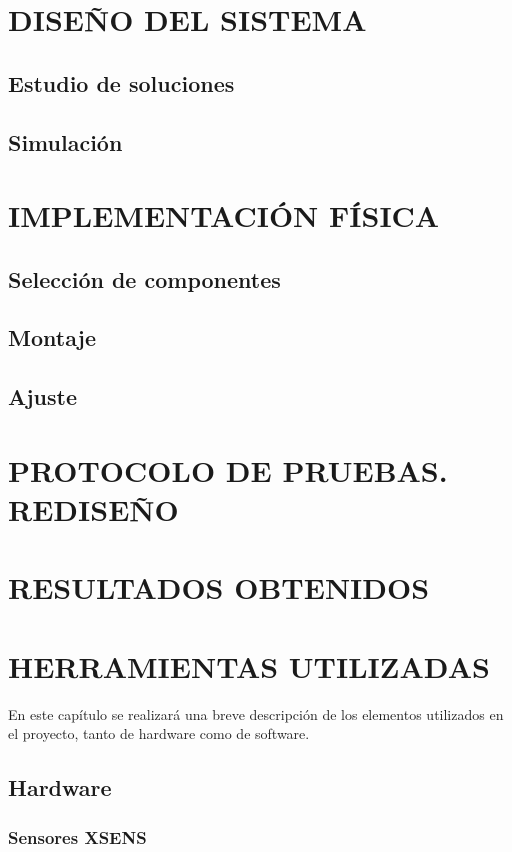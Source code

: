 \documentclass[10pt,a4paper]{report}
\begin{document}
\chapter{DISEÑO DEL SISTEMA}

\section{Estudio de soluciones}
\section{Simulación}

\chapter{IMPLEMENTACIÓN FÍSICA}
\section{Selección de componentes}
\section{Montaje}
\section{Ajuste}

\chapter{PROTOCOLO DE PRUEBAS. REDISEÑO}

\chapter{RESULTADOS OBTENIDOS}
\chapter{HERRAMIENTAS UTILIZADAS}

En este capítulo se realizará una breve descripción de los elementos utilizados en el proyecto, tanto de hardware como de software.

\section{Hardware}

\subsection{Sensores XSENS}
\end{document}
